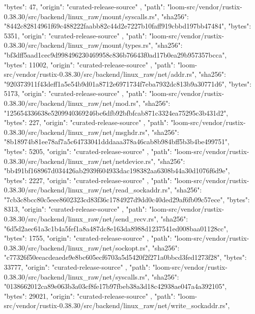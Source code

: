 {{      "bytes": 47,
      "origin": "curated-release-source"
    },
    {
      "path": "loom-src/vendor/rustix-0.38.30/src/backend/linux_raw/mount/syscalls.rs",
      "sha256": "8442c82814961f69c488222faabb82c44d2e7227b10faff919cbbd197bb47484",
      "bytes": 5351,
      "origin": "curated-release-source"
    },
    {
      "path": "loom-src/vendor/rustix-0.38.30/src/backend/linux_raw/mount/types.rs",
      "sha256": "bf3dff5aad1cec9d998496230469958c836b76643f0ad17b0ea29b957357bcca",
      "bytes": 11002,
      "origin": "curated-release-source"
    },
    {
      "path": "loom-src/vendor/rustix-0.38.30/src/backend/linux_raw/net/addr.rs",
      "sha256": "920373911f43deff1a5e54b9d01a8712e6971734f7eba7932dc813b9a30771d6",
      "bytes": 5173,
      "origin": "curated-release-source"
    },
    {
      "path": "loom-src/vendor/rustix-0.38.30/src/backend/linux_raw/net/mod.rs",
      "sha256": "125654336638e5209940369246bc6dfb92bfbfcab871c3324ea75295c3b431d2",
      "bytes": 227,
      "origin": "curated-release-source"
    },
    {
      "path": "loom-src/vendor/rustix-0.38.30/src/backend/linux_raw/net/msghdr.rs",
      "sha256": "8b18974b81ee78af7a5c64733041dddaaa378a46cab8b984bff5b3b4be499751",
      "bytes": 5205,
      "origin": "curated-release-source"
    },
    {
      "path": "loom-src/vendor/rustix-0.38.30/src/backend/linux_raw/net/netdevice.rs",
      "sha256": "bb491bf168967d034426ab2939f604933dac198382aa6308b44a30d1076f6d9e",
      "bytes": 2227,
      "origin": "curated-release-source"
    },
    {
      "path": "loom-src/vendor/rustix-0.38.30/src/backend/linux_raw/net/read_sockaddr.rs",
      "sha256": "7cb3c8bcc80c5eee8602323cd83f36c1784927d9dd0c40ded29af6fb09c57ece",
      "bytes": 8313,
      "origin": "curated-release-source"
    },
    {
      "path": "loom-src/vendor/rustix-0.38.30/src/backend/linux_raw/net/send_recv.rs",
      "sha256": "6d5d2aec61a3c1b4a5fef1a8a487dc8e163da8988d1237541ed008baa01128cc",
      "bytes": 1755,
      "origin": "curated-release-source"
    },
    {
      "path": "loom-src/vendor/rustix-0.38.30/src/backend/linux_raw/net/sockopt.rs",
      "sha256": "c77326f50eeacdeaede9e8bc605ecf6703a5d5420f2f271a0bbcd3fed1273f28",
      "bytes": 33777,
      "origin": "curated-release-source"
    },
    {
      "path": "loom-src/vendor/rustix-0.38.30/src/backend/linux_raw/net/syscalls.rs",
      "sha256": "0138662012ca89e063b3a03cf8fe17b97fbeb38a3d18c42938ae047a4a392105",
      "bytes": 29021,
      "origin": "curated-release-source"
    },
    {
      "path": "loom-src/vendor/rustix-0.38.30/src/backend/linux_raw/net/write_sockaddr.rs",
}}
